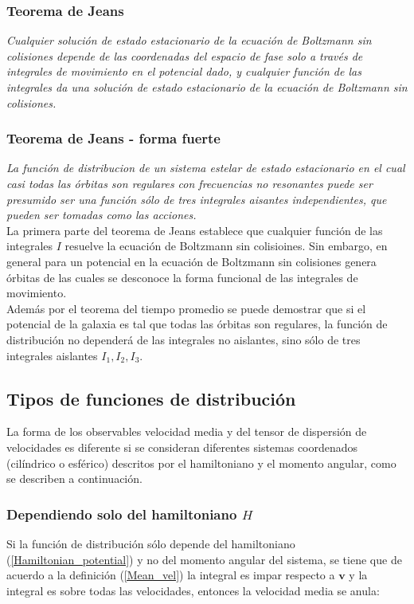 \subsubsection{Teorema de Jeans} \emph{Cualquier solución de estado estacionario de la ecuación de Boltzmann sin colisiones depende de las coordenadas del espacio de fase solo a través de integrales de movimiento en el potencial dado, y cualquier función de las integrales da una solución de estado estacionario de la ecuación de Boltzmann sin colisiones.}

\subsubsection{Teorema de Jeans - forma fuerte}

\emph{La función de distribucion de un sistema estelar de estado estacionario en el cual casi todas las órbitas son regulares con frecuencias no resonantes puede ser presumido ser una función sólo de tres integrales aisantes independientes, que pueden ser tomadas como las acciones.}\\

La primera parte del teorema de Jeans establece que cualquier función de las integrales $I$ resuelve la ecuación de Boltzmann sin colisioines. Sin embargo, en general para un potencial en la ecuación de Boltzmann sin colisiones genera órbitas de las cuales se desconoce la forma funcional de las integrales de movimiento.\\

Además por el teorema del tiempo promedio \cite{BT08} se puede demostrar que si el potencial de la galaxia es tal que todas las órbitas son regulares, la función de distribución no dependerá de las integrales no aislantes, sino sólo de tres integrales aislantes $I_1, I_2, I_3$.

\subsection{Tipos de funciones de distribución }

La forma de los observables velocidad media y del tensor de dispersión de velocidades es diferente si se consideran diferentes sistemas coordenados (cilíndrico o esférico) descritos por el hamiltoniano y el momento angular, como se describen a continuación.

\subsubsection{Dependiendo solo del hamiltoniano $H$}
Si la función de distribución sólo depende del hamiltoniano (\ref{Hamiltonian_potential}) y no del momento angular del sistema, se tiene que de acuerdo a la definición (\ref{Mean_vel}) la integral es impar respecto a $\textbf{v}$ y la integral es sobre todas las velocidades, entonces la velocidad media se anula:


